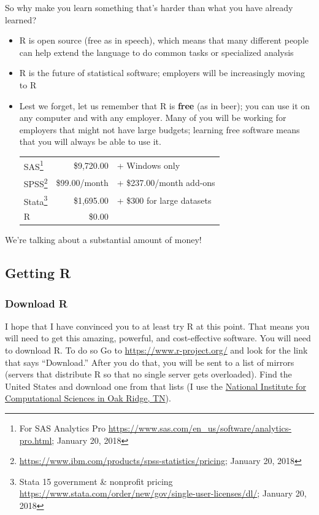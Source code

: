 \documentclass[]{article}
\let\rmarkdownfootnote\footnote%
\def\footnote{\protect\rmarkdownfootnote}
\begin{document}
So why make you learn something that's harder than what you have already
learned?

\begin{itemize}
\item
  R is open source (free as in speech), which means that many different
  people can help extend the language to do common tasks or specialized
  analysis
\item
  R is the future of statistical software; employers will be
  increasingly moving to R
\item
  Lest we forget, let us remember that R is \textbf{free} (as in beer);
  you can use it on any computer and with any employer. Many of you will
  be working for employers that might not have large budgets; learning
  free software means that you will always be able to use it.

  \begin{longtable}[]{@{}lrl@{}}
  \toprule
  SAS\footnote{For SAS Analytics Pro
    \url{https://www.sas.com/en_us/software/analytics-pro.html}; January
    20, 2018} & \$9,720.00 & + Windows only\tabularnewline
  SPSS\footnote{\url{https://www.ibm.com/products/spss-statistics/pricing};
    January 20, 2018} & \$99.00/month & + \$237.00/month
  add-ons\tabularnewline
  Stata\footnote{Stata 15 government \& nonprofit pricing
    \url{https://www.stata.com/order/new/gov/single-user-licenses/dl/};
    January 20, 2018} & \$1,695.00 & + \$300 for large
  datasets\tabularnewline
  R & \$0.00 &\tabularnewline
  \bottomrule
  \end{longtable}
\end{itemize}

We're talking about a substantial amount of money!

\subsection{Getting R}\label{getting-r}

\subsubsection{Download R}\label{download-r}

I hope that I have convinced you to at least try R at this point. That
means you will need to get this amazing, powerful, and cost-effective
software. You will need to download R. To do so Go to
\url{https://www.r-project.org/} and look for the link that says
``Download.'' After you do that, you will be sent to a list of mirrors
(servers that distribute R so that no single server gets overloaded).
Find the United States and download one from that lists (I use the
\href{https://mirrors.nics.utk.edu/cran/}{National Institute for
Computational Sciences in Oak Ridge, TN}).
\end{document}
